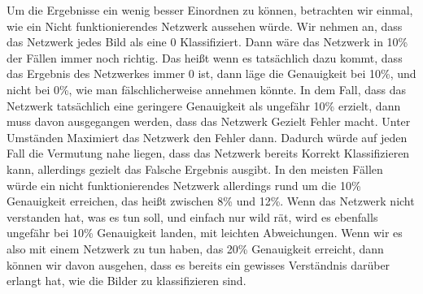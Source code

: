 \documentclass[12pt]{article}
\begin{document}
Um die Ergebnisse ein wenig besser Einordnen zu können, betrachten wir einmal, wie ein Nicht funktionierendes Netzwerk aussehen würde. Wir nehmen an, dass das Netzwerk jedes Bild als eine 0 Klassifiziert. Dann wäre das Netzwerk in 10\% der Fällen immer noch richtig. Das heißt wenn es tatsächlich dazu kommt, dass das Ergebnis des Netzwerkes immer 0 ist, dann läge die Genauigkeit bei 10\%, und nicht bei 0\%, wie man fälschlicherweise annehmen könnte. In dem Fall, dass das Netzwerk tatsächlich eine geringere Genauigkeit als ungefähr 10\% erzielt, dann muss davon ausgegangen werden, dass das Netzwerk Gezielt Fehler macht. Unter Umständen Maximiert das Netzwerk den Fehler dann. Dadurch würde auf jeden Fall die Vermutung nahe liegen, dass das Netzwerk bereits Korrekt Klassifizieren kann, allerdings gezielt das Falsche Ergebnis ausgibt. In den meisten Fällen würde ein nicht funktionierendes Netzwerk allerdings rund um die 10\% Genauigkeit erreichen, das heißt zwischen 8\% und 12\%. Wenn das Netzwerk nicht verstanden hat, was es tun soll, und einfach nur wild rät, wird es ebenfalls ungefähr bei 10\% Genauigkeit landen, mit leichten Abweichungen. Wenn wir es also mit einem Netzwerk zu tun haben, das 20\% Genauigkeit erreicht, dann können wir davon ausgehen, dass es bereits ein gewisses Verständnis darüber erlangt hat, wie die Bilder zu klassifizieren sind. 
\end{document}
